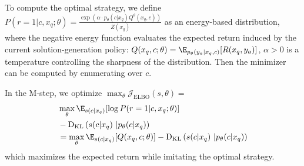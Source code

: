 To compute the optimal strategy, we define \( P(r=1 | c,x_q;\theta) = \frac{\exp(\alpha\cdot p_\theta(c|x_q) Q^\theta(x_q,c))}{Z(x_q)}\) as an energy-based distribution, where the negative energy function evaluates the expected return induced by the current solution-generation policy: \( Q(x_q,c;\theta) =  \E_{ p_\theta(y_a | x_q,c)}[R(x_q,y_a)]\), \(\alpha>0\) is a temperature controlling the sharpness of the distribution.  Then the minimizer can be computed by enumerating over \( c \). 


In the M-step, we optimize \( \max_\theta \mathcal{J}_{\mathrm{ELBO}}(s,\theta) = \)
\begin{align*}
    & \max_\theta \E_{s(c | x_q)}[\log P(r=1 | c,x_q;\theta)]\\&  -\mathrm{D_{KL}}\left(s(c | x_q)\ | p_\theta(c | x_q)\right)\\
    &= \max_\theta \E_{s(c | x_q)}[Q(x_q,c;\theta)]-\mathrm{D_{KL}}\left(s(c | x_q)\ | p_\theta(c | x_q)\right)
\end{align*}
which maximizes the expected return while imitating the optimal strategy.


